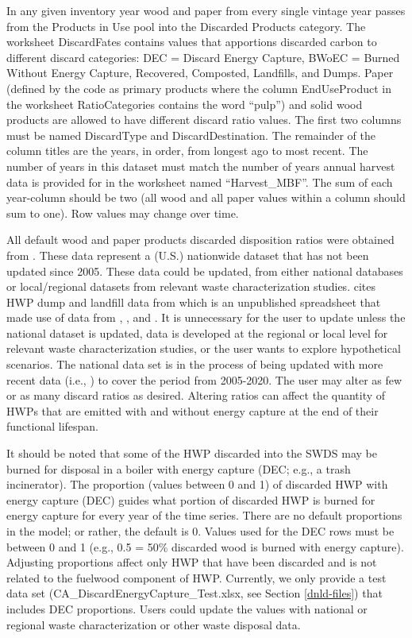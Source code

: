 \documentclass[
  openany]{book}
\begin{document}
In any given inventory year wood and paper from every single vintage year passes from the Products in Use pool into the Discarded Products category. The worksheet DiscardFates contains values that apportions discarded carbon to different discard categories: DEC = Discard Energy Capture, BWoEC = Burned Without Energy Capture, Recovered, Composted, Landfills, and Dumps. Paper (defined by the code as primary products where the column EndUseProduct in the worksheet RatioCategories contains the word ``pulp'') and solid wood products are allowed to have different discard ratio values. The first two columns must be named DiscardType and DiscardDestination. The remainder of the column titles are the years, in order, from longest ago to most recent. The number of years in this dataset must match the number of years annual harvest data is provided for in the worksheet named ``Harvest\_MBF''. The sum of each year-column should be two (all wood and all paper values within a column should sum to one). Row values may change over time.

All default wood and paper products discarded disposition ratios were obtained from \textcite{skog2008}. These data represent a (U.S.) nationwide dataset that has not been updated since 2005. These data could be updated, from either national databases or local/regional datasets from relevant waste characterization studies. \textcite{skog2008} cites HWP dump and landfill data from \textcite{freed2004} which is an unpublished spreadsheet that made use of data from \textcite{epa2006}, \textcite{melosi1982}, and \textcite{melosi1999}. It is unnecessary for the user to update unless the national dataset is updated, data is developed at the regional or local level for relevant waste characterization studies, or the user wants to explore hypothetical scenarios. The national data set is in the process of being updated with more recent data (i.e., \textcite{usepa2020}) to cover the period from 2005-2020. The user may alter as few or as many discard ratios as desired. Altering ratios can affect the quantity of HWPs that are emitted with and without energy capture at the end of their functional lifespan.

It should be noted that some of the HWP discarded into the SWDS may be burned for disposal in a boiler with energy capture (DEC; e.g., a trash incinerator). The proportion (values between 0 and 1) of discarded HWP with energy capture (DEC) guides what portion of discarded HWP is burned for energy capture for every year of the time series. There are no default proportions in the model; or rather, the default is 0. Values used for the DEC rows must be between 0 and 1 (e.g., 0.5 = 50\% discarded wood is burned with energy capture). Adjusting proportions affect only HWP that have been discarded and is not related to the fuelwood component of HWP. Currently, we only provide a test data set (CA\_DiscardEnergyCapture\_Test.xlsx, see Section \ref{dnld-files}) that includes DEC proportions. Users could update the values with national or regional waste characterization or other waste disposal data.
\end{document}
